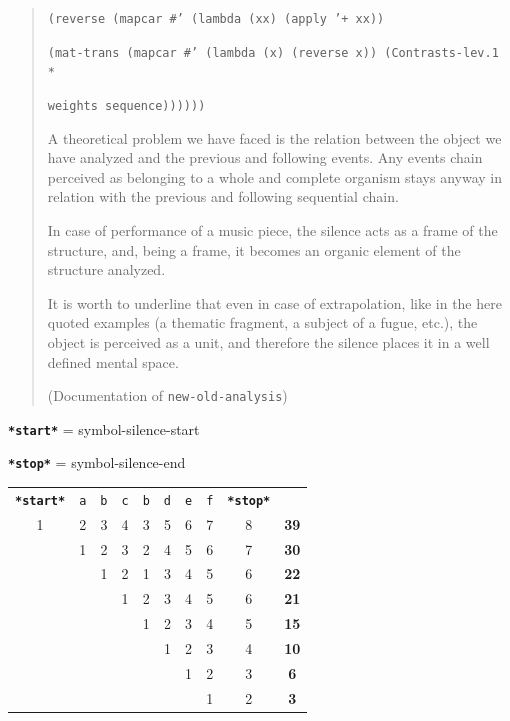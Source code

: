 \begin{quotation}
\noindent\texttt{\footnotesize \quad   (reverse (mapcar \#' (lambda (xx) (apply '+ xx))}

\noindent\texttt{\footnotesize \quad \quad (mat-trans (mapcar \#' (lambda (x) (reverse x)) (Contrasts-lev.1 *}

\noindent\texttt{\footnotesize \quad \quad \quad weights sequence))))))}

\begin{slshape} 
\noindent A theoretical problem we have faced is the relation between the object we have analyzed and the previous and following events. Any events chain perceived as belonging to a whole and complete organism stays anyway in relation with the previous and following sequential chain.

\noindent In case of performance of a music piece, the silence acts as a frame of the structure, and, being a frame, it becomes an organic element of the structure analyzed.

\noindent It is worth to underline that even in case of extrapolation, like in the here quoted examples (a thematic fragment, a subject of a fugue, etc.), the object is perceived as a unit, and therefore the silence places it in a well defined mental space.
\end{slshape}

\noindent (Documentation of \texttt{new-old-analysis})
\end{quotation} 

\noindent \texttt{\textbf{*start*}} = symbol-silence-start

\noindent \texttt{\textbf{*stop*}} = symbol-silence-end

\begin{center}
\begin{tabular}{cccccccccc}
  \cellcolor {gray!20} \texttt{\textbf{*start*}} & \cellcolor {gray!20} \texttt{a} & \cellcolor {gray!20} \texttt{b} & \cellcolor {gray!20} \texttt{c} & \cellcolor {gray!20} \texttt{b} & \cellcolor {gray!20} \texttt{d} & \cellcolor {gray!20} \texttt{e} & \cellcolor {gray!20} \texttt{f} & \cellcolor {gray!20} \texttt{\textbf{*stop*}} & \\
  1 & 2 & 3 & 4 & 3 & 5 & 6 & 7 & 8 & \cellcolor {gray!20} \bf 39 \\
    & 1 & 2 & 3 & 2 & 4 & 5 & 6 & 7 & \cellcolor {gray!20} \bf 30 \\
    &   & 1 & 2 & 1 & 3 & 4 & 5 & 6 & \cellcolor {gray!20} \bf 22 \\
    &   &   & 1 & 2 & 3 & 4 & 5 & 6 & \cellcolor {gray!20} \bf 21 \\
    &   &   &   & 1 & 2 & 3 & 4 & 5 & \cellcolor {gray!20} \bf 15 \\   
    &   &   &   &   & 1 & 2 & 3 & 4 & \cellcolor {gray!20} \bf 10 \\   
    &   &   &   &   &   & 1 & 2 & 3 & \cellcolor {gray!20} \bf 6 \\    
    &   &   &   &   &   &   & 1 & 2 & \cellcolor {gray!20} \bf 3 \\      
\end{tabular}
\end{center}

